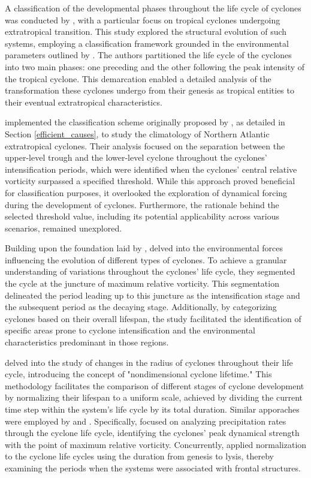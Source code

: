 A classification of the developmental phases throughout the life cycle of cyclones was conducted by \citet{evans2003objective}, with a particular focus on tropical cyclones undergoing extratropical transition. This study explored the structural evolution of such systems, employing a classification framework grounded in the environmental parameters outlined by \citet{hart2003cyclone}. The authors partitioned the life cycle of the cyclones into two main phases: one preceding and the other following the peak intensity of the tropical cyclone. This demarcation enabled a detailed analysis of the transformation these cyclones undergo from their genesis as tropical entities to their eventual extratropical characteristics.

\citet{gray2006classifying} implemented the classification scheme originally proposed by \citet{deveson2002classification}, as detailed in Section \ref{efficient_causes}, to study the climatology of Northern Atlantic extratropical cyclones. Their analysis focused on the separation between the upper-level trough and the lower-level cyclone throughout the cyclones' intensification periods, which were identified when the cyclones' central relative vorticity surpassed a specified threshold. While this approach proved beneficial for classification purposes, it overlooked the exploration of dynamical forcing during the development of cyclones. Furthermore, the rationale behind the selected threshold value, including its potential applicability across various scenarios, remained unexplored.

Building upon the foundation laid by \citet{gray2006classifying}, \citet{dacre2009spatial} delved into the environmental forces influencing the evolution of different types of cyclones. To achieve a granular understanding of variations throughout the cyclones' life cycle, they segmented the cycle at the juncture of maximum relative vorticity. This segmentation delineated the period leading up to this juncture as the intensification stage and the subsequent period as the decaying stage. Additionally, by categorizing cyclones based on their overall lifespan, the study facilitated the identification of specific areas prone to cyclone intensification and the environmental characteristics predominant in those regions.

\citet{rudeva2007climatology} delved into the study of changes in the radius of cyclones throughout their life cycle, introducing the concept of "nondimensional cyclone lifetime." This methodology facilitates the comparison of different stages of cyclone development by normalizing their lifespan to a uniform scale, achieved by dividing the current time step within the system's life cycle by its total duration. Similar apporaches were employed by \citet{booth2018extratropical} and \citet{schemm2018during}. Specifically, \citet{booth2018extratropical} focused on analyzing precipitation rates through the cyclone life cycle, identifying the cyclones' peak dynamical strength with the point of maximum relative vorticity. Concurrently, \citet{schemm2018during} applied normalization to the cyclone life cycles using the duration from genesis to lysis, thereby examining the periods when the systems were associated with frontal structures.


